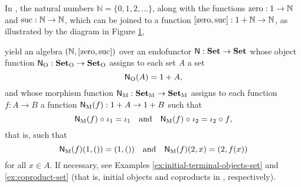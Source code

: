 \begin{example}

  \label{ex:algebra-natural-numbers}


  In \set, the natural numbers $\mathbb{N} = \{0,1,2,...\}$, along
  with the functions $\operatorname{zero}: 1 \to \mathbb{N}$ and $\operatorname{suc}: \mathbb{N}
  \to \mathbb{N}$, which can be joined to a function $[\operatorname{zero},\operatorname{suc}]: 1
  + \mathbb{N} \to \mathbb{N}$, as illustrated by the diagram in
  Figure \ref{fig:coproduct-natural-numbers},
  \begin{figure}[htbp]
    \begin{center}
    \end{center}
    \caption{}
    \label{fig:coproduct-natural-numbers}
  \end{figure}
  yield an algebra $(\mathbb{N},[\operatorname{zero},\operatorname{suc}])$ over an endofunctor
  $\mathsf{N}: \mathbf{Set} \to \mathbf{Set}$ whose object function $\mathsf{N}_{\operatorname{O}}:
  \mathcal{\mathbf{Set}}_{\operatorname{O}} \to \mathcal{\mathbf{Set}}_{\operatorname{O}}$ assigns to each set $A$ a set
  \begin{equation*}
    \mathsf{N}_{\operatorname{O}}(A) = 1 + A
    \text{,}
  \end{equation*}
  and whose morphism function $\mathsf{N}_{\operatorname{M}}: \mathcal{\mathbf{Set}}_{\operatorname{M}} \to \mathcal{\mathbf{Set}}_{\operatorname{M}}$
  assigns to each function $f: A \to B$ a function $\mathsf{N}_{\operatorname{M}}(f): 1 +
  A \to 1 + B$ such that
  \begin{equation*}
    \mathsf{N}_{\operatorname{M}}(f) \mathrel{\circ} \iota_{1} = \iota_{1}
    \quad
    \text{and}
    \quad
    \mathsf{N}_{\operatorname{M}}(f) \mathrel{\circ} \iota_{2} = \iota_{2} \mathrel{\circ} f
    \text{,}
  \end{equation*}
  that is, such that
  \begin{equation*}
    \mathsf{N}_{\operatorname{M}}(f)(1,()) = (1,())
    \quad
    \text{and}
    \quad
    \mathsf{N}_{\operatorname{M}}(f)(2,x) = (2,f(x))
  \end{equation*}
  for all $x \in A$. If necessary, see Examples
  \ref{ex:initial-terminal-objects-set} and \ref{ex:coproduct-set}
  (that is, initial objects and coproducts in \set, respectively).

\end{example}

